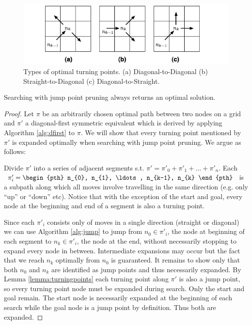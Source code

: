 \begin{figure}[tb]
       \begin{center}
		   \includegraphics[width=0.95\columnwidth, trim = 10mm 10mm 10mm 0mm]
			{diagrams/turningpoints.png}
       \end{center}
	\vspace{-3pt}
       \caption{Types of optimal turning points. (a) Diagonal-to-Diagonal
(b) Straight-to-Diagonal (c) Diagonal-to-Straight.}
       \label{fig:turningpoints}
\end{figure}

\begin{theorem}
\label{theorem:jumping}
Searching with jump point pruning always returns an optimal solution. 
\end{theorem}
\begin{proof}
Let $\pi$ be an arbitrarily chosen optimal path between two nodes
on a grid and $\pi'$ a diagonal-first symmetric equivalent which is derived
by applying Algorithm \ref{alg:dfirst} to $\pi$.
We will show that every turning point mentioned by $\pi'$ is expanded optimally 
when searching with jump point pruning. We argue as follows:
\par
Divide $\pi'$ into a series of adjacent segments s.t. 
$\pi' = \pi'_{0} + \pi'_{1} + \ldots + \pi'_{n} $. Each $\pi'_{i} = \begin{pth} n_{0}, n_{1},
\ldots, n_{k-1}, n_{k} \end{pth}$ is a subpath along which all moves involve
travelling in the same direction (e.g.  only ``up'' or ``down'' etc).  Notice
that with the exception of the start and goal, every node at the beginning and
end of a segment is also a turning point.
\par
Since each $\pi'_{i}$ consists only of moves in a single direction
(straight or diagonal) we can use Algorithm \ref{alg:jump} to jump from $n_{0}
\in \pi'_{i}$, the node at beginning of each segment to $n_{k} \in \pi'_{i}$, the
node at the end, without necessarily stopping to expand every node in between.
Intermediate expansions may occur but the fact that we reach $n_{k}$
optimally from $n_{0}$ is guaranteed.
It remains to show only that both $n_{0}$ and $n_{k}$ are identified as
jump points and thus necessarily expanded. 
By Lemma \ref{lemma:turningpoints} each turning point along $\pi'$ is 
also a jump point, so every turning point node must be expanded during search.
Only the start and goal remain. The start node is necessarily expanded at the
beginning of each search while the goal node is a jump point by definition.
Thus both are expanded.
\end{proof}
